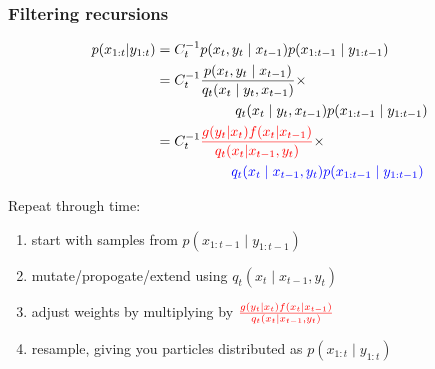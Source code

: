 \documentclass{beamer}
\begin{document}
\begin{frame}[fragile]
\frametitle{Filtering recursions}

\begin{align*}
p(x_{1:t}|y_{1:t}) &=C_{t}^{-1} p(x_{t} , y_t  \mid x_{t-1})p(x_{1:t-1} \mid y_{1:t-1}) \\
&= C_{t}^{-1} \frac{p(x_t, y_t \mid x_{t-1})}{q_{t}(x_{t} \mid y_{t},x_{t-1})} \times \\
& \hspace{20mm} q_{t}(x_{t} \mid y_{t},x_{t-1})p(x_{1:t-1} \mid y_{1:t-1}) \\
&= C_{t}^{-1} \begingroup\color{red} \frac{g(y_t|x_t)f(x_t|x_{t-1})}{q_t(x_t|x_{t-1},y_t) } \endgroup \times \\
& \hspace{19mm} \begingroup\color{blue} q_t(x_t \mid x_{t-1},y_t) p(x_{1:t-1} \mid y_{1:t-1}) \endgroup\\
\end{align*}

Repeat through time:
\begin{enumerate}
\item start with samples from $p(x_{1:t-1} \mid y_{1:t-1})$
\item mutate/propogate/extend using $q_t(x_t \mid x_{t-1},y_t)$
\item adjust weights by multiplying by $ \begingroup\color{red} \frac{g(y_t|x_t)f(x_t|x_{t-1})}{q_t(x_t|x_{t-1},y_t) } \endgroup $
\item resample, giving you particles distributed as $p(x_{1:t} \mid y_{1:t})$
\end{enumerate}


\end{frame}



\begin{frame}
\printbibliography
\end{frame}
\end{document}
